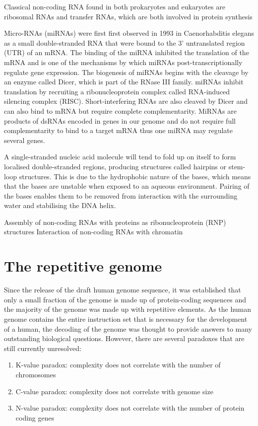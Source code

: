 Classical non-coding RNA found in both prokaryotes and eukaryotes are ribosomal RNAs and transfer RNAs, which are both involved in protein synthesis

Micro-RNAs (miRNAs) were first first observed in 1993 in Caenorhabditis elegans\cite{pmid8252621} as a small double-stranded RNA that were bound to the 3' untranslated region (UTR) of an mRNA. The binding of the miRNA inhibited the translation of the mRNA and is one of the mechanisms by which miRNAs post-transcriptionally regulate gene expression. The biogenesis of miRNAs begins with the cleavage by an enzyme called Dicer\cite{pmid11201747}, which is part of the RNase III family. miRNAs inhibit translation by recruiting a ribonucleoprotein complex called RNA-induced silencing complex (RISC). Short-interfering RNAs are also cleaved by Dicer and can also bind to mRNA but require complete complementarity. MiRNAs are products of dsRNAs encoded in genes in our genome and do not require full complementarity to bind to a target mRNA thus one miRNA may regulate several genes.

A single-stranded nucleic acid molecule will tend to fold up on itself to form localised double-stranded regions, producing structures called hairpins or stem-loop structures. This is due to the hydrophobic nature of the bases, which means that the bases are unstable when exposed to an aqueous environment. Pairing of the bases enables them to be removed from interaction with the surrounding water and stabilising the DNA helix.

Assembly of non-coding RNAs with proteins as ribonucleoprotein (RNP) structures
Interaction of non-coding RNAs with chromatin

\section{The repetitive genome}

Since the release of the draft human genome sequence\cite{venter2001sequence, lander2001initial}, it was established that only a small fraction of the genome is made up of protein-coding sequences and the majority of the genome was made up with repetitive elements. As the human genome contains the entire instruction set that is necessary for the development of a human, the decoding of the genome was thought to provide answers to many outstanding biological questions. However, there are several paradoxes that are still currently unresolved:

\begin{enumerate}
   \item K-value paradox: complexity does not correlate with the number of chromosomes
   \item C-value paradox: complexity does not correlate with genome size
   \item N-value paradox: complexity does not correlate with the number of protein coding genes
\end{enumerate}

